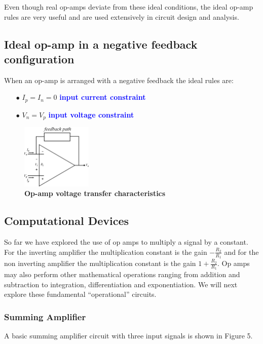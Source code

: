 \documentclass[a4 paper]{article}
\newcommand{\blue}[1]{\textcolor{blue}{#1}}
\numberwithin{equation}{section}
\newcommand{\0}{\mathbf{0}}
\begin{document}
Even though real op-amps deviate from these ideal conditions, the ideal op-amp rules are very useful and are used extensively in circuit design and analysis.


\subsection{Ideal op-amp in a negative feedback configuration}


When an op-amp is arranged with a negative feedback the ideal rules are:

\begin{itemize} \itemsep3pt \parskip0pt 
  \item[$\bullet$] $I_p = I_n = 0$ \hspace{8 mm} \blue{\bf input current constraint}
  \item[$\bullet$] $V_n = V_p$ \hspace{13.5 mm} \blue{\bf input voltage constraint}
\end{itemize}


\begin{figure}[!ht]
  \centering
  \label{op-amp_curve}
  \includegraphics[width=0.3\textwidth]{./images/circuit2/circuit_append2}
  \caption{{\bf Op-amp voltage transfer characteristics}}
\end{figure}

\subsection{Computational Devices}

So far we have explored the use of op amps to multiply a signal by a constant. For the inverting amplifier the multiplication constant is the gain $-\frac{R_2}{R_1}$ and for the non inverting amplifier the multiplication constant is the gain $1 + \frac{R_2}{R_1}$. Op amps may also perform other mathematical operations ranging from addition and subtraction to integration, differentiation and exponentiation. We will next explore these fundamental ``operational'' circuits.

\subsubsection{Summing Amplifier}
A basic summing amplifier circuit with three input signals is shown in Figure 5.
























%
%
\end{document}
